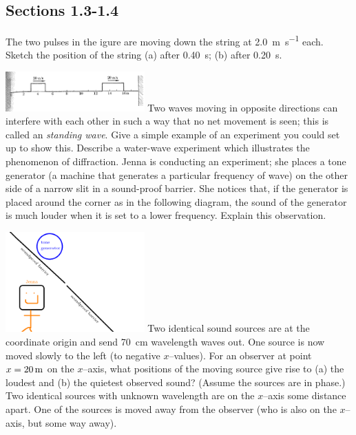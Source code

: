 \documentclass[a4paper]{exam}
\begin{document}
  \subsection*{Sections 1.3-1.4}
  \begin{questions}
    \question The two pulses in the igure are moving down the string at \SI{2.0}{\metre\per\second} each. Sketch the position
              of the string (a) after \SI{0.40}{\second}; (b) after \SI{0.20}{\second}.

              \includegraphics[width=0.4\textwidth]{beuche131}
    \question Two waves moving in opposite directions can interfere with each other in such a way that no net movement is seen;
              this is called an \emph{standing wave}. Give a simple example of an experiment you could set up to show this.
    \question Describe a water-wave experiment which illustrates the phenomenon of diffraction.
    \question Jenna is conducting an experiment; she places a tone generator (a machine that generates a particular frequency
              of wave) on the other side of a narrow slit in a sound-proof barrier. She notices that, if the generator is placed
              around the corner as in the following diagram, the sound of the generator is much louder when it is set to a lower
              frequency. Explain this observation.

              \includegraphics[width=0.4\textwidth]{jenna}
    \question Two identical sound sources are at the coordinate origin and send \SI{70}{\centi\metre} wavelength waves out. One source is
              now moved slowly to the left (to negative $ x$--values). For an observer at point $ x = 20\thinspace\si{\metre} $ on the $ x$--axis,
              what positions of the moving source give rise to (a) the loudest and (b) the quietest observed sound? (Assume the sources
              are in phase.)
    \question Two identical sources with unknown wavelength are on the $ x$--axis some distance apart. One of the sources is moved
              away from the observer (who is also on the $ x$--axis, but some way away).
      \begin{parts}

\end{parts}
\end{questions}
\end{document}
